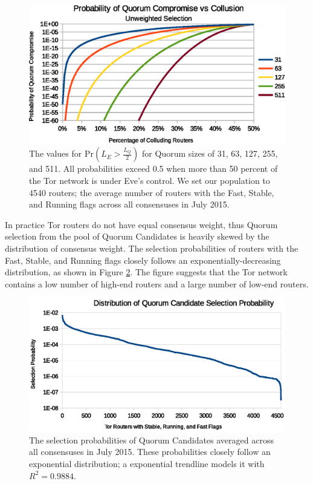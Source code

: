 \documentclass[conference]{IEEEtran}
\begin{document}
\begin{figure}[htbp]
	\centering
	\includegraphics[width=\linewidth]{../assets/analysis/QuorumSelectionUnweighted.eps}
	\caption{The values for $ \mathrm{Pr}(L_{E} > \frac{L_{Q}}{2}) $ for Quorum sizes of 31, 63, 127, 255, and 511. All probabilities exceed 0.5 when more than 50 percent of the Tor network is under Eve's control. We set our population to 4540 routers; the average number of routers with the Fast, Stable, and Running flags across all consensuses in July 2015\cite{TorMetrics}.}
	\label{fig:quorumUnweightedMajority}
\end{figure}

In practice Tor routers do not have equal consensus weight, thus Quorum selection from the pool of Quorum Candidates is heavily skewed by the distribution of consensus weight. The selection probabilities of routers with the Fast, Stable, and Running flags closely follows an exponentially-decreasing distribution, as shown in Figure \ref{fig:weightDist}. The figure suggests that the Tor network contains a low number of high-end routers and a large number of low-end routers.

\begin{figure}[htbp]
	\centering
	\includegraphics[width=\linewidth]{../assets/analysis/QuorumCandidateWeights.eps}
	\caption{The selection probabilities of Quorum Candidates averaged across all consensuses in July 2015. These probabilities closely follow an exponential distribution; a exponential trendline models it with $ R^{2} = 0.9884 $.}
	\label{fig:weightDist}
\end{figure}
\end{document}
